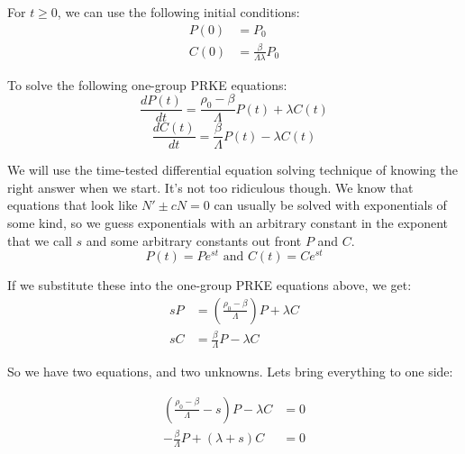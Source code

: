 \documentclass[letter]{article}
\begin{document}
For $t \geq 0$, we can use the following initial conditions:
\begin{equation*}
  \begin{split}
    P(0) &= P_0 \\
    C(0) &= \frac{\beta}{\Lambda\lambda}P_0
  \end{split}
\end{equation*}

To solve the following one-group PRKE equations:
\begin{equation*}
      \frac{dP(t)}{dt}= \frac{\rho_0-\beta}{\Lambda}P(t)+\lambda{}C(t)
\end{equation*}
\begin{equation*}
    \frac{dC(t)}{dt}=\frac{\beta}{\Lambda}P(t)-\lambda{}C(t)
\end{equation*}

We will use the time-tested differential equation solving technique of
knowing the right answer when we start. It's not too ridiculous
though. We know that equations that look like $N' \pm cN = 0$ can usually be solved with
exponentials of some kind, so we guess exponentials with an arbitrary
constant in the exponent that we call $s$ and some arbitrary constants
out front $P$ and $C$.
\begin{equation*}
  P(t) = Pe^{st} \text{ and } C(t) = Ce^{st}
\end{equation*}

If we substitute these into the one-group PRKE equations above, we get:
\begin{equation*}
  \begin{split}
    sP &= \left(\frac{\rho_0-\beta}{\Lambda}\right)P+\lambda{}C \\
    sC &= \frac{\beta}{\Lambda}P-\lambda{}C
  \end{split}
\end{equation*}

So we have two equations, and two unknowns. Lets bring everything to
one side:

\begin{equation*}
  \begin{split}
     \left(\frac{\rho_0-\beta}{\Lambda}-s\right)P-\lambda{}C &= 0\\
    -\frac{\beta}{\Lambda}P+(\lambda{}+s)C &= 0 
  \end{split}
\end{equation*}
\end{document}
